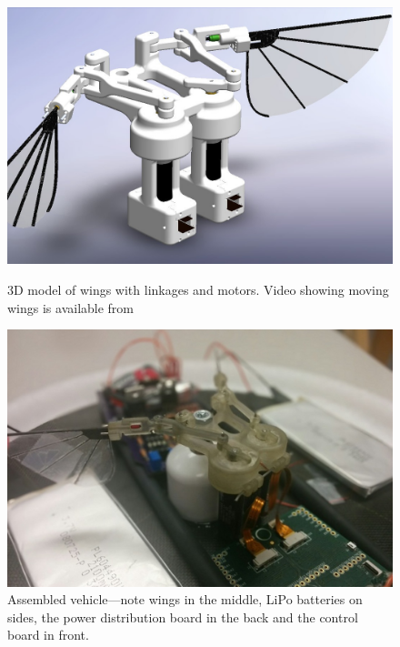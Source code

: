 \begin{figure}
\centering
{}
\includegraphics[width=\textwidth]{Files/Figures/wings.jpg}
\caption[3D model of wings]{3D model of wings with linkages and motors. Video showing moving wings is available from \cite{cpsgroup} \newline}
\label{fig_wings}
\endminipage\hfill
{}
\center
\includegraphics[width=\textwidth]{Files/Figures/robot.jpg}
\caption[Assembled vehicle]{Assembled vehicle---note wings in the middle, LiPo batteries on sides, the power distribution board in the back and the control board in front.}
\label{fig_robot}
\endminipage\hfill
\end{figure}

